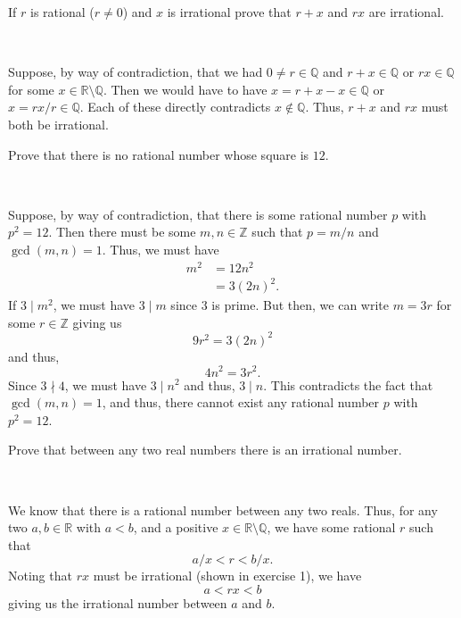 \documentclass[12 pt, letterpaper]{hmcpset}
\begin{document}
\begin{problem}[1.]
	If $r$ is rational ($r \neq 0$) and $x$ is irrational prove that $r + x$ and $rx$ are irrational.
\end{problem}

\begin{solution} ~
	
	Suppose, by way of contradiction, that we had $0 \neq r \in \mathbb{Q}$ and $r + x \in \mathbb{Q}$ or $rx \in \mathbb{Q}$ for some $x \in \mathbb{R} \setminus \mathbb{Q}$. Then we would have to have $x = r + x - x \in \mathbb{Q}$ or $x = rx/r \in \mathbb{Q}$. Each of these directly contradicts $x \notin \mathbb{Q}$. Thus, $r + x$ and $rx$ must both be irrational.
\end{solution}

\pagebreak

\begin{problem}[2.]
	Prove that there is no rational number whose square is $12$.
\end{problem}

\begin{solution} ~
	
	Suppose, by way of contradiction, that there is some rational number $p$ with $p^{2} = 12$. Then there must be some $m, n \in \mathbb{Z}$ such that $p = m/n$ and $\gcd (m, n) = 1$. Thus, we must have
	\[
		\begin{split}
			m^{2} & = 12 n^2 \\
			      & = 3 (2n)^{2}.
		\end{split}
	\]
	If $3 \mid m^{2}$, we must have $3 \mid m$ since $3$ is prime. But then, we can write $m = 3r$ for some $r \in \mathbb{Z}$ giving us
	\[
		9 r^{2} = 3 (2n)^{2}
	\]
	and thus,
	\[
		4n^{2} = 3 r^{2}.
	\]
	Since $3 \nmid 4$, we must have $3 \mid n^{2}$ and thus, $3 \mid n$. This contradicts the fact that $\gcd(m, n) = 1$, and thus, there cannot exist any rational number $p$ with $p^{2} = 12$.
\end{solution}

\pagebreak

\begin{problem}[2*.]
	Prove that between any two real numbers there is an irrational number.
\end{problem}

\begin{solution}~
	
	We know that there is a rational number between any two reals. Thus, for any two $a, b \in \mathbb{R}$ with $a < b$, and a positive $x \in \mathbb{R} \setminus \mathbb{Q}$, we have some rational $r$ such that
	\[
		a/x < r < b/x.
	\]
	Noting that $rx$ must be irrational (shown in exercise 1), we have
	\[
		a < rx < b
	\]
	giving us the irrational number between $a$ and $b$.
\end{solution}
\end{document}
